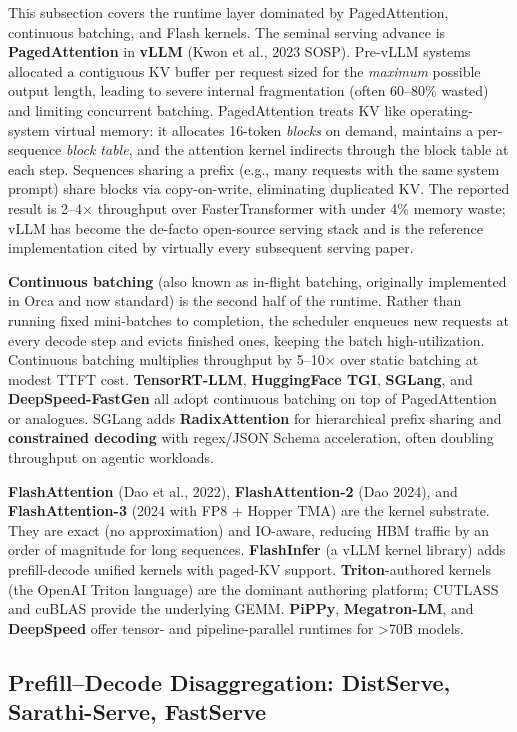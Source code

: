 This subsection covers the runtime layer dominated by PagedAttention, continuous batching, and Flash kernels. The seminal serving advance is \textbf{PagedAttention} in \textbf{vLLM} (Kwon et al., 2023 SOSP). Pre-vLLM systems allocated a contiguous KV buffer per request sized for the \emph{maximum} possible output length, leading to severe internal fragmentation (often 60--80\% wasted) and limiting concurrent batching. PagedAttention treats KV like operating-system virtual memory: it allocates 16-token \emph{blocks} on demand, maintains a per-sequence \emph{block table}, and the attention kernel indirects through the block table at each step. Sequences sharing a prefix (e.g., many requests with the same system prompt) share blocks via copy-on-write, eliminating duplicated KV. The reported result is 2--4× throughput over FasterTransformer with under 4\% memory waste; vLLM has become the de-facto open-source serving stack and is the reference implementation cited by virtually every subsequent serving paper.

\textbf{Continuous batching} (also known as in-flight batching, originally implemented in Orca and now standard) is the second half of the runtime. Rather than running fixed mini-batches to completion, the scheduler enqueues new requests at every decode step and evicts finished ones, keeping the batch high-utilization. Continuous batching multiplies throughput by 5--10× over static batching at modest TTFT cost. \textbf{TensorRT-LLM}, \textbf{HuggingFace TGI}, \textbf{SGLang}, and \textbf{DeepSpeed-FastGen} all adopt continuous batching on top of PagedAttention or analogues. SGLang adds \textbf{RadixAttention} for hierarchical prefix sharing and \textbf{constrained decoding} with regex/JSON Schema acceleration, often doubling throughput on agentic workloads.

\textbf{FlashAttention} (Dao et al., 2022), \textbf{FlashAttention-2} (Dao 2024), and \textbf{FlashAttention-3} (2024 with FP8 + Hopper TMA) are the kernel substrate. They are exact (no approximation) and IO-aware, reducing HBM traffic by an order of magnitude for long sequences. \textbf{FlashInfer} (a vLLM kernel library) adds prefill-decode unified kernels with paged-KV support. \textbf{Triton}-authored kernels (the OpenAI Triton language) are the dominant authoring platform; CUTLASS and cuBLAS provide the underlying GEMM. \textbf{PiPPy}, \textbf{Megatron-LM}, and \textbf{DeepSpeed} offer tensor- and pipeline-parallel runtimes for \textgreater70B models.

\subsection{Prefill--Decode Disaggregation: DistServe, Sarathi-Serve, FastServe}\label{prefilldecode-disaggregation-distserve-sarathi-serve-fastserve}

